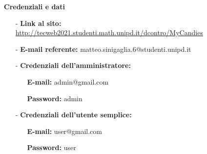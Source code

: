 \begin{titlepage}
\begin{center}
        \begin{minipage}[t]{0.7\textwidth}
            \centering\textbf{\large Credenziali e dati}
                \vspace{0.5cm}
                \begin{itemize}
                    \item[-] \textbf{Link al sito:} \url{http://tecweb2021.studenti.math.unipd.it/dcontro/MyCandies}
                    \item[-] \textbf{E-mail referente:} matteo.sinigaglia.6@studenti.unipd.it
                    \item[-] \textbf{Credenziali dell'amministratore:} 
                        \begin{itemize}
                            \item[] \textbf{E-mail:}   admin@gmail.com
                            \item[] \textbf{Password:} admin
                        \end{itemize}
                    \item[-] \textbf{Credenziali dell'utente semplice:} 
                        \begin{itemize}
                            \item[] \textbf{E-mail:}   user@gmail.com
                            \item[] \textbf{Password:} user
                        \end{itemize}
                \end{itemize}
        \end{minipage}
   \end{center}
\end{titlepage}